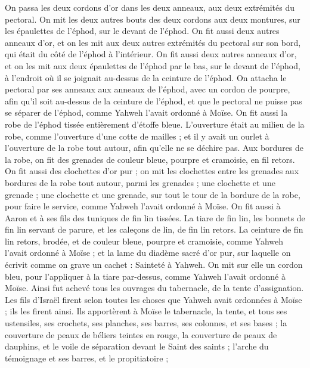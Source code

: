 \begin{multicols}{2}
On passa les deux cordons d'or dans les deux anneaux, aux deux extrémités du pectoral.
On mit les deux autres bouts des deux cordons aux deux montures, sur les épaulettes de l'éphod, sur le devant de l'éphod.
On fit aussi deux autres anneaux d'or, et on les mit aux deux autres extrémités du pectoral sur son bord, qui était du côté de l'éphod à l’intérieur.
On fit aussi deux autres anneaux d'or, et on les mit aux deux épaulettes de l'éphod par le bas, sur le devant de l'éphod, à l'endroit où il se joignait au-dessus de la ceinture de l'éphod.
On attacha le pectoral par ses anneaux aux anneaux de l'éphod, avec un cordon de pourpre, afin qu'il soit au-dessus de la ceinture de l'éphod, et que le pectoral ne puisse pas se séparer de l'éphod, comme Yahweh l'avait ordonné à Moïse.
On fit aussi la robe de l'éphod tissée entièrement d’étoffe bleue.
L'ouverture était au milieu de la robe, comme l'ouverture d’une cotte de mailles ; et il y avait un ourlet à l'ouverture de la robe tout autour, afin qu'elle ne se déchire pas.
Aux bordures de la robe, on fit des grenades de couleur bleue, pourpre et cramoisie, en fil retors.
On fit aussi des clochettes d’or pur ; on mit les clochettes entre les grenades aux bordures de la robe tout autour, parmi les grenades ;
une clochette et une grenade ; une clochette et une grenade, sur tout le tour de la bordure de la robe, pour faire le service, comme Yahweh l'avait ordonné à Moïse.
On fit aussi à Aaron et à ses fils des tuniques de fin lin tissées.
La tiare de fin lin, les bonnets de fin lin servant de parure, et les caleçons de lin, de fin lin retors.
La ceinture de fin lin retors, brodée, et de couleur bleue, pourpre et cramoisie, comme Yahweh l'avait ordonné à Moïse ;
et la lame du diadème sacré d’or pur, sur laquelle on écrivit comme on grave un cachet : Sainteté à Yahweh.
On mit sur elle un cordon bleu, pour l'appliquer à la tiare par-dessus, comme Yahweh l'avait ordonné à Moïse.
Ainsi fut achevé tous les ouvrages du tabernacle, de la tente d'assignation. Les fils d'Israël firent selon toutes les choses que Yahweh avait ordonnées à Moïse ; ils les firent ainsi.
Ils apportèrent à Moïse le tabernacle, la tente, et tous ses ustensiles, ses crochets, ses planches, ses barres, ses colonnes, et ses bases ;
la couverture de peaux de béliers teintes en rouge, la couverture de peaux de dauphins, et le voile de séparation devant le Saint des saints ;
l'arche du témoignage et ses barres, et le propitiatoire ;

\end{multicols}
